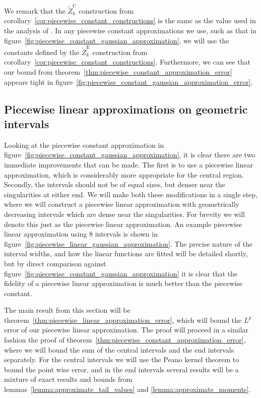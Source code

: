 \documentclass[manuscript,review]{acmart}
\begin{document}
We remark that the $ \widetilde{Z}_k^\mathrm{C} $ construction from corollary~\ref{cor:piecewise_constant_constructions} is the same as the value used in the analysis of \citet[(4)]{giles2019random_quadrature}. In any piecewise constant approximations we use, such as that in figure~\ref{fig:piecewise_constant_gaussian_approximation}, we will use the constants defined by  the $ \widetilde{Z}_k^\mathrm{E} $ construction from corollary~\ref{cor:piecewise_constant_constructions}. Furthermore, we can see that our bound from theorem~\ref{thm:piecewise_constant_approximation_error} appears tight in figure~\ref{fig:piecewise_constant_gaussian_approximation_error}.

\subsection{Piecewise linear approximations on geometric intervals}
\label{sec:piecewise_linear_approximations_on_geometric_intervals}

Looking at the piecewise constant approximation in figure~\ref{fig:piecewise_constant_gaussian_approximation}, it is clear there are two immediate improvements that can be made. The first is to use a piecewise linear approximation, which is considerably more appropriate for the central region. Secondly, the intervals should not be of equal sizes, but denser near the singularities at either end. We will make both these modifications in a single step, where we will construct a piecewise linear approximation with geometrically decreasing intervals which are dense near the singularities. For brevity we will denote this just as the piecewise linear approximation. An example piecewise linear approximation using 8 intervals is shown in figure~\ref{fig:piecewise_linear_gaussian_approximation}. The precise nature of the interval widths, and how the linear functions are fitted will be detailed shortly, but by direct comparison against figure~\ref{fig:piecewise_constant_gaussian_approximation} it is clear that the fidelity of a piecewise linear approximation is much better than the piecewise constant. 

The main result from this section will be theorem~\ref{thm:piecewise_linear_approximation_error}, which will bound the $ L^p $ error of our piecewise linear approximation. The proof will proceed in a similar fashion the proof of theorem~\ref{thm:piecewise_constant_approximation_error}, where we will bound the sum of the central intervals and the end intervals separately. For the central intervals we will use the Peano kernel theorem to bound the point wise error, and in the end intervals several results will be a mixture of exact results and bounds from lemmas~\ref{lemma:approximate_tail_values} and \ref{lemma:approximate_moments}.
\end{document}
